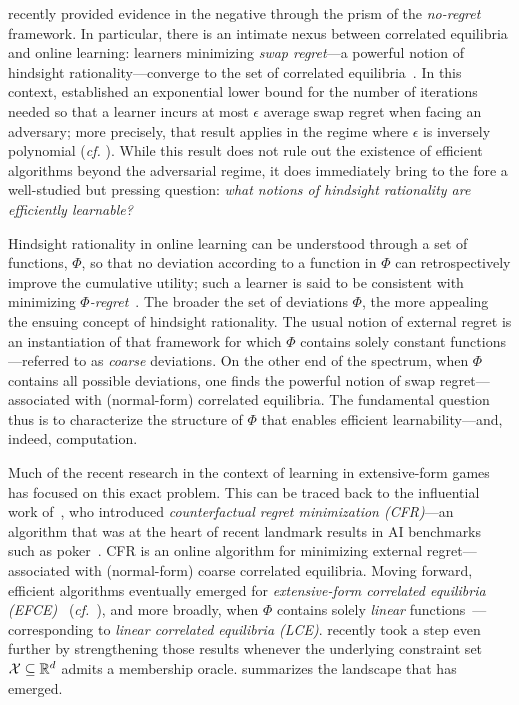 \citet{Daskalakis24:Lower} recently provided evidence in the negative through the prism of the \emph{no-regret} framework. In particular, there is an intimate nexus between correlated equilibria and online learning: learners minimizing \emph{swap regret}---a powerful notion of hindsight rationality---converge to the set of correlated equilibria~\citep{Blum07:From,Stoltz05:Internal}. In this context, \citet{Daskalakis24:Lower} established an exponential lower bound for the number of iterations needed so that a learner incurs at most $\epsilon$ average swap regret when facing an adversary; more precisely, that result applies in the regime where $\epsilon$ is inversely polynomial (\emph{cf.} \citet{Dagan24:From,Peng24:Fast}). While this result does not rule out the existence of efficient algorithms beyond the adversarial regime, it does immediately bring to the fore a well-studied but pressing question: \emph{what notions of hindsight rationality are efficiently learnable?}

Hindsight rationality in online learning can be understood through a set of functions, $\Phi$, so that no deviation according to a function in $\Phi$ can retrospectively improve the cumulative utility; such a learner is said to be consistent with minimizing \emph{$\Phi$-regret}~\citep{Greenwald03:General,Stoltz07:Learning,Gordon08:No}. The broader the set of deviations $\Phi$, the more appealing the ensuing concept of hindsight rationality. The usual notion of external regret is an instantiation of that framework for which $\Phi$ contains solely constant functions---referred to as \emph{coarse} deviations. On the other end of the spectrum, when $\Phi$ contains all possible deviations, one finds the powerful notion of swap regret---associated with (normal-form) correlated equilibria. The fundamental question thus is to characterize the structure of $\Phi$ that enables efficient learnability---and, indeed, computation.

Much of the recent research in the context of learning in extensive-form games has focused on this exact problem. This can be traced back to the influential work of~\citet{Zinkevich07:Regret}, who introduced \emph{counterfactual regret minimization (CFR)}---an algorithm that was at the heart of recent landmark results in AI benchmarks such as poker~\citep{Brown17:Superhuman,Brown19:Superhuman,Bowling15:Heads,Moravvcik17:DeepStack}. CFR is an online algorithm for minimizing external regret---associated with (normal-form) coarse correlated equilibria. Moving forward, efficient algorithms eventually emerged for \emph{extensive-form correlated equilibria (EFCE)}~\citep{Huang08:Computing,Farina22:Simple,Dudik09:SamplingBased,Bai22:Efficient} (\emph{cf.}~\citet{Morrill21:Efficient,Morrill21:Hindsight}), and more broadly, when $\Phi$ contains solely \emph{linear} functions~\citep{Farina24:Polynomial,Farina23:Polynomial}---corresponding to \emph{linear correlated equilibria (LCE)}. \citet{Daskalakis24:Efficient} recently took a step even further by strengthening those results whenever the underlying constraint set ${\mathcal{X}} \subseteq \mathbb R^d$ admits a membership oracle.  summarizes the landscape that has emerged.

